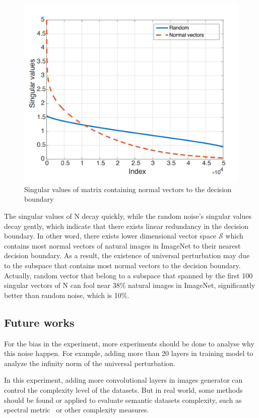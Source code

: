 \documentclass{article}
\begin{document}
 \begin{figure}
    \centering
    \includegraphics[width=\linewidth]{MD_UAP2.png}
    \caption{\small Singular values of matrix  containing normal vectors to the decision boundary \cite{Moosavi-Dezfooli_2017_CVPR}}
    \label{fig:MD_UAP2}
\end{figure}

The singular values of N decay quickly, while the random noise’s singular values decay gently, which indicate that there exists linear redundancy in the decision boundary. In other word, there exists lower dimensional vector space $\mathcal{S}$ which contains most normal vectors of natural images in ImageNet to their nearest decision boundary. As a result, the existence of universal perturbation may due to the subspace that contains most normal vectors to the decision boundary. Actually, random vector that belong to a subspace that spanned by the first 100 singular vectors of N can fool near 38\% natural images in ImageNet, significantly better than random noise, which is 10\%.
\subsection{Future works}
For the bias in the experiment, more experiments should be done to analyse why this noise happen. For example, adding more than 20 layers in training model to analyze the infinity norm of the universal perturbation.

In this experiment, adding more convolutional layers in images generator can control the complexity level of the datasets. But in real world, some methods should be found or applied to evaluate semantic datasets complexity, such as spectral metric~\cite{Branchaud-Charron_2019_CVPR} or other complexity measures.
\end{document}
